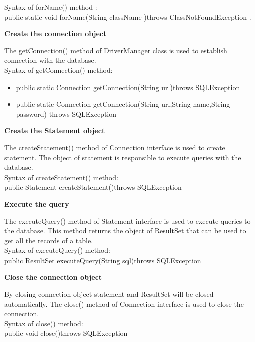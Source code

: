 Syntax of forName() method : \\
public static void forName(String className )throws ClassNotFoundException . \\[0.4in]
\begin{large}
\textbf{Create the connection object \\[0.2in]}
\end{large}
The getConnection() method of DriverManager class is used to establish connection with the
database. \\
Syntax of getConnection() method: \\
\begin{itemize}
\item public static Connection getConnection(String url)throws SQLException
\item public static Connection getConnection(String url,String name,String password)
throws SQLException \\[0.2in]
\end{itemize}
\begin{large}
\textbf{Create the Statement object} \\[0.2in]
\end{large}
The createStatement() method of Connection interface is used to create statement. The
object of statement is responsible to execute queries with the database. \\
Syntax of createStatement() method:\\
public Statement createStatement()throws SQLException \\[0.2in]
\begin{large}
\textbf{Execute the query} \\[0.2in]
\end{large}
The executeQuery() method of Statement interface is used to execute queries to the
database. This method returns the object of ResultSet that can be used to get all the records of a table. \\
Syntax of executeQuery() method: \\
public ResultSet executeQuery(String sql)throws SQLException \\[0.2in]
\begin{large}
\textbf{Close the connection object} \\[0.2in]
\end{large}
By closing connection object statement and ResultSet will be closed automatically.
The close() method of Connection interface is used to close the connection.\\
Syntax of close() method:\\
public void close()throws SQLException
\thispagestyle{fancy}
\newpage
\thispagestyle{fancy}
